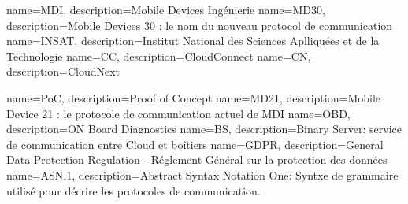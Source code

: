  {
	name=MDI,
	description={Mobile Devices Ingénierie}
}
 {
	name=MD30,
	description={Mobile Devices 30 : le nom du nouveau protocol de communication }
}
 {
	name=INSAT,
	description={Institut National des Sciences Aplliquées et de la Technologie}
}
 {
	name=CC,
	description={CloudConnect}
}
 {
	name=CN,
	description={CloudNext}
}

 {
	name=PoC,
	description={Proof of Concept}
}
 {
	name=MD21,
	description={Mobile Device 21 : le protocole de communication actuel de MDI}
}
 {
	name=OBD,
	description={ON Board Diagnostics}
}
 {
	name=BS,
	description={Binary Server: service de communication entre Cloud et boîtiers}
}
 {
	name=GDPR,
	description={General Data Protection Regulation - Réglement Général sur la protection des données\cite{gdpr} }
}
 {
	name=ASN.1,
	description={Abstract Syntax Notation One: Syntxe de grammaire utilisé pour décrire les protocoles de communication.}
}